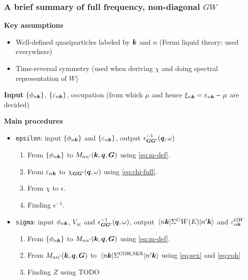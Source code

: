 \documentclass[t]{beamer}
\newcommand{\shortcode}[1]{\texttt{#1}}
\begin{document}
\begin{frame}[allowframebreaks]
\frametitle{A brief summary of full frequency, non-diagonal $GW$}

\textbf{Key assumptions} \begin{itemize}
    \item Well-defined quasiparticles labeled by $\vb*{k}$ and $n$
    (Fermi liquid theory; used everywhere)
    \item Time-reversal symmetry (used when deriving $\chi$ and doing spectral representation of $W$)
\end{itemize}

\textbf{Input} $\{\phi_{n \vb*{k}}\}$, $\{\varepsilon_{n \vb*{k}}\}$, 
occupation (from which $\mu$ and hence $\xi_{n \vb*{k}} = \varepsilon_{n \vb*{k}} - \mu$
are decided)

\textbf{Main procedures} \begin{itemize}
    \item \shortcode{epsilon}: input $\{\phi_{n \vb*{k}}\}$ and $\{\varepsilon_{n \vb*{k}}\}$, 
    output $\epsilon^{-1}_{\vb*{G} \vb*{G}'}(\vb*{q}, \omega)$
    \begin{enumerate}
        \item From $\{\phi_{n \vb*{k}}\}$ 
        to $M_{n n'}(\vb*{k}, \vb*{q}, \vb*{G})$ using \eqref{eq:m-def}.
        \item From $\varepsilon_{n \vb*{k}}$ to $\chi_{\vb*{G} \vb*{G}'}(\vb*{q}, \omega)$ using \eqref{eq:chi-full}.
        \item From $\chi$ to $\epsilon$.
        \item Finding $\epsilon^{-1}$.
    \end{enumerate}

    \item \shortcode{sigma}: input $\phi_{n \vb*{k}}$, $V_{\text{xc}}$ and $\epsilon^{-1}_{\vb*{G} \vb*{G}'}(\vb*{q}, \omega)$,
    output $\mel{n \vb*{k}}{\Sigma^GW(E)}{n' \vb*{k}}$ and $\varepsilon_{n \vb*{k}}^{GW}$ 
    \begin{enumerate}
        \item From $\{\phi_{n \vb*{k}}\}$ 
        to $M_{n n'}(\vb*{k}, \vb*{q}, \vb*{G})$ using \eqref{eq:m-def}.
        \item From $M_{n n'}(\vb*{k}, \vb*{q}, \vb*{G})$ to 
        $\mel{n \vb*{k}}{\Sigma^{\text{COH}, \text{SEX}}}{n' \vb*{k}}$
        using \eqref{eq:sex} and \eqref{eq:coh}
        \item Finding $Z$ using TODO
    \end{enumerate}
\end{itemize}


\end{frame}
\end{document}
